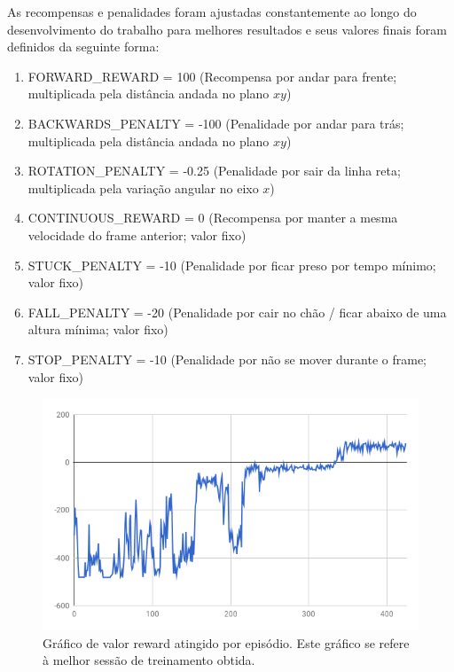 \documentclass[twoside,conference,a4paper]{IEEEtran}
\begin{document}
As recompensas e penalidades foram ajustadas constantemente ao longo do desenvolvimento do trabalho para melhores resultados e seus valores finais foram definidos da seguinte forma:

\begin{enumerate}[label={\alph*)}]
\item FORWARD\_REWARD = 100 (Recompensa por andar para frente; multiplicada pela distância andada no plano $xy$)
\item BACKWARDS\_PENALTY = -100 (Penalidade por andar para trás; multiplicada pela distância andada no plano $xy$)
\item ROTATION\_PENALTY = -0.25 (Penalidade por sair da linha reta; multiplicada pela variação angular no eixo $x$)
\item CONTINUOUS\_REWARD = 0 (Recompensa por manter a mesma velocidade do frame anterior; valor fixo)
\item STUCK\_PENALTY = -10 (Penalidade por ficar preso por tempo mínimo; valor fixo)
\item FALL\_PENALTY = -20 (Penalidade por cair no chão / ficar abaixo de uma altura mínima; valor fixo)
\item STOP\_PENALTY = -10 (Penalidade por não se mover durante o frame; valor fixo)
\end{enumerate}

\begin{figure}[ht!]
  \centering
  \includegraphics[width=1\hsize]{figuras/reward.png}
  \caption{Gráfico de valor reward atingido por episódio. Este gráfico se refere à melhor sessão de treinamento obtida.}
  \label{fig:graf1}
\end{figure}
\end{document}
